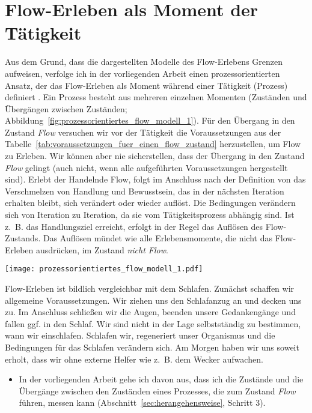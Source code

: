 

\section{Flow-Erleben als Moment der Tätigkeit} 

\label{sec:flow_erleben_als_moment_der_tatigkeit}

Aus dem Grund, dass die dargestellten Modelle des Flow-Erlebens Grenzen aufweisen, verfolge ich in der vorliegenden Arbeit einen prozessorientierten Ansatz, der das Flow-Erleben als Moment während einer Tätigkeit (Prozess) definiert \citep[][S.~2]{Grueter2006}. Ein Prozess besteht aus mehreren einzelnen Momenten (Zuständen und Übergängen zwischen Zuständen; Abbildung~\ref{fig:prozessorientiertes_flow_modell_1}). Für den Übergang in den Zustand \emph{Flow} versuchen wir vor der Tätigkeit die Voraussetzungen aus der  Tabelle~\ref{tab:voraussetzungen_fuer_einen_flow_zustand} herzustellen, um Flow zu Erleben. Wir können aber nie sicherstellen, dass der Übergang in den Zustand \emph{Flow} gelingt (auch nicht, wenn alle aufgeführten Voraussetzungen hergestellt sind). Erlebt der Handelnde Flow, folgt im Anschluss nach der Definition von \citet{Henk2014} das Verschmelzen von Handlung und Bewusstsein, das in der nächsten Iteration erhalten bleibt, sich verändert oder wieder auflöst. Die Bedingungen verändern sich von Iteration zu Iteration, da sie vom Tätigkeitsprozess abhängig sind. Ist z.~B. das Handlungsziel erreicht, erfolgt in der Regel das Auflösen des Flow-Zustands. Das Auflösen mündet wie alle Erlebensmomente, die nicht das Flow-Erleben ausdrücken, im Zustand \emph{nicht Flow}. 
\begin{sidewaysfigure}
	\texttt{[image: prozessorientiertes\_flow\_modell\_1.pdf]} \caption[Prozessorientiertes Modell des Flow-Erlebens (Einführung)]{Prozessorientiertes Modell mit Auslassungen der implizit messbaren Auswirkungen des Flow-Erlebens} \label{fig:prozessorientiertes_flow_modell_1} 
\end{sidewaysfigure}

Flow-Erleben ist bildlich vergleichbar mit dem Schlafen. Zunächst schaffen wir allgemeine Voraussetzungen. Wir ziehen uns den Schlafanzug an und decken uns zu. Im Anschluss schließen wir die Augen, beenden unsere Gedankengänge und fallen ggf. in den Schlaf. Wir sind nicht in der Lage selbstständig zu bestimmen, wann wir einschlafen. Schlafen wir, regeneriert unser Organismus und die Bedingungen für das Schlafen verändern sich. Am Morgen haben wir uns soweit erholt, dass wir ohne externe Helfer wie z.~B. dem Wecker aufwachen. 
\begin{itemize}
	
	\item In der vorliegenden Arbeit gehe ich davon aus, dass ich die Zustände und die Übergänge zwischen den Zuständen eines Prozesses, die zum Zustand \emph{Flow} führen, messen kann (Abschnitt~\ref{sec:herangehensweise}, Schritt 3). 
\end{itemize}

